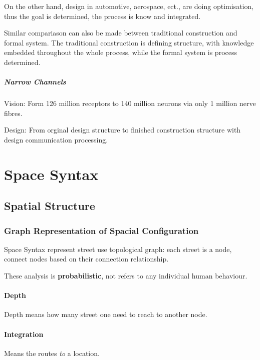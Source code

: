 \documentclass[a4paper, openany]{book}
\begin{document}
On the other hand, design in automotive, aerospace, ect., are doing optimisation, thus the goal is determined, the process is know and integrated.

Similar compariason can also be made between traditional construction and formal system. The traditional construction is defining structure, with knowledge embedded throughout the whole process, while the formal system is process determined.

\paragraph{Narrow Channels}

Vision: Form 126 million receptors to 140 million neurons via only 1 million nerve fibres.

Design: From orginal design structure to finished construction structure with design communication processing.

\chapter{Space Syntax}

\section{Spatial Structure}

\subsection{Graph Representation of Spacial Configuration}

Space Syntax represent street use topological graph: each street is a node, connect nodes based on their connection relationship.

These analysis is \textbf{probabilistic}, not refers to any individual human behaviour.

\subsubsection{Depth}

Depth means how many street one need to reach to another node.

\subsubsection{Integration}

Means the routes \textit{to} a location.
\end{document}
